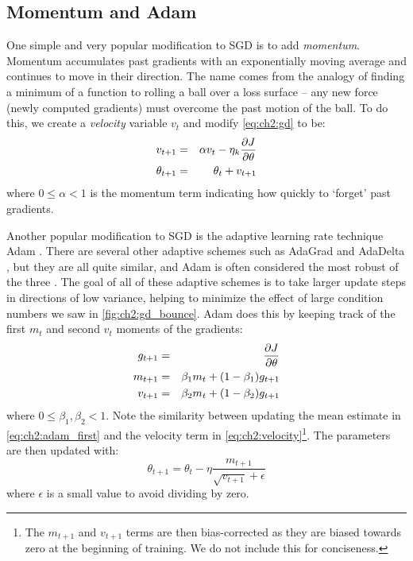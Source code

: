 \subsection{Momentum and Adam}
One simple and very popular modification to SGD is to add \emph{momentum}.
Momentum accumulates past gradients with an exponentially moving average and
continues to move in their direction. The name comes from the analogy of finding
a minimum of a function to rolling a ball over a loss surface --
any new force (newly computed gradients) must overcome the past motion of the
ball. To do this, we create a \emph{velocity} variable $v_{t}$ and modify
\eqref{eq:ch2:gd} to be:
\begin{eqnarray}
  v_{t+1} &=& \alpha v_t - \eta_k\frac{\partial J}{\partial \theta} \label{eq:ch2:velocity}\\
  \theta_{t+1} &=& \theta_t + v_{t+1} \\
\end{eqnarray}
where $0\leq\alpha<1$ is the momentum term indicating how quickly to `forget'
past gradients.

Another popular modification to SGD is the adaptive learning rate technique Adam
\cite{kingma_adam:_2014}. There are several other adaptive schemes such as
AdaGrad \cite{duchi_adaptive_2011} and AdaDelta \cite{zeiler_adadelta:_2012}, but
they are all quite similar, and Adam is often considered the most robust of the
three \cite{goodfellow_deep_2016}. The goal of all of these adaptive schemes is
to take larger update steps in directions of low variance, helping to minimize
the effect of large condition numbers we saw in \autoref{fig:ch2:gd_bounce}.
Adam does this by keeping track of the first $m_t$ and second $v_t$ moments of the
gradients:
\begin{eqnarray}
  g_{t+1} &=& \frac{\partial J}{\partial \theta} \\
  m_{t+1} &=& \beta_1 m_{t} + (1-\beta_1)g_{t+1} \label{eq:ch2:adam_first}\\
  v_{t+1} &=& \beta_2 m_{t} + (1-\beta_2)g_{t+1} 
\end{eqnarray}
where $0 \leq \beta_1, \beta_2 < 1$. Note the similarity between updating the
mean estimate in \eqref{eq:ch2:adam_first} and the velocity term in
\eqref{eq:ch2:velocity}\footnote{The $m_{t+1}$ and $v_{t+1}$ terms are then
bias-corrected as they are biased towards zero at the beginning of training. We
do not include this for conciseness.}. The parameters are then updated with:
\begin{equation}
  \theta_{t+1} = \theta_t - \eta \frac{m_{t+1}}{\sqrt{v_{t+1}} + \epsilon}
\end{equation}
where $\epsilon$ is a small value to avoid dividing by zero. 
